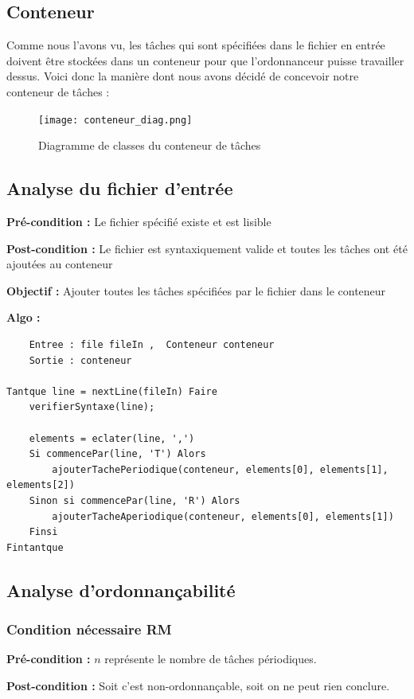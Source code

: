 		\subsection{Conteneur}
			Comme nous l'avons vu, les tâches qui sont spécifiées dans le fichier en entrée doivent être stockées dans un conteneur pour que l'ordonnanceur puisse travailler dessus. Voici donc la manière dont nous avons décidé de concevoir notre conteneur de tâches :
			\begin{figure}[!h]
				\centering
				\texttt{[image: conteneur\_diag.png]}
				\caption{Diagramme de classes du conteneur de tâches}
			\end{figure}
			\FloatBarrier
						
		\subsection{Analyse du fichier d'entrée}
				\textbf{Pré-condition :} Le fichier spécifié existe et est lisible
				
				\textbf{Post-condition :} Le fichier est syntaxiquement valide et toutes les tâches ont été ajoutées au conteneur
				
				\textbf{Objectif :} Ajouter toutes les tâches spécifiées par le fichier dans le conteneur
				
				\textbf{Algo :} 
					\begin{lstlisting}
	Entree : file fileIn ,  Conteneur conteneur
	Sortie : conteneur
	
Tantque line = nextLine(fileIn) Faire
	verifierSyntaxe(line);
	
	elements = eclater(line, ',')
	Si commencePar(line, 'T') Alors
		ajouterTachePeriodique(conteneur, elements[0], elements[1], elements[2])
	Sinon si commencePar(line, 'R') Alors
		ajouterTacheAperiodique(conteneur, elements[0], elements[1])
	Finsi
Fintantque
					\end{lstlisting}
		
		
		\subsection{Analyse d'ordonnançabilité}
			
			\subsubsection{Condition nécessaire RM}
				\textbf{Pré-condition :} $n$ représente le nombre de tâches périodiques.
				
				\textbf{Post-condition :} Soit c'est non-ordonnançable, soit on ne peut rien conclure.
				
